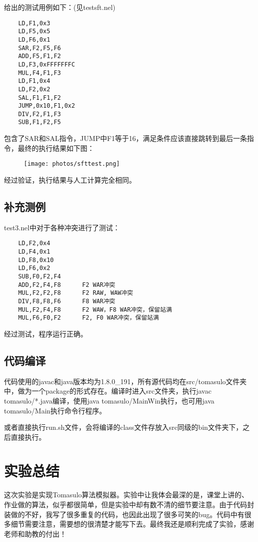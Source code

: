 \documentclass[paper=a4, fontsize=11pt, UTF8]{article} %
\begin{document}
给出的测试用例如下：(见testsft.nel)
\begin{lstlisting}
    LD,F1,0x3
    LD,F5,0x5
    LD,F6,0x1
    SAR,F2,F5,F6
    ADD,F5,F1,F2
    LD,F3,0xFFFFFFFC
    MUL,F4,F1,F3
    LD,F1,0x4
    LD,F2,0x2
    SAL,F1,F1,F2
    JUMP,0x10,F1,0x2
    DIV,F2,F1,F3
    SUB,F1,F2,F5
\end{lstlisting}
包含了SAR和SAL指令，JUMP中F1等于16，满足条件应该直接跳转到最后一条指令，最终的执行结果如下图：
\begin{figure}[H]
    \centering
    \texttt{[image: photos/sfttest.png]}
\end{figure}
经过验证，执行结果与人工计算完全相同。

\subsection{补充测例}
test3.nel中对于各种冲突进行了测试：
\begin{lstlisting}
    LD,F2,0x4
    LD,F4,0x1
    LD,F8,0x10
    LD,F6,0x2
    SUB,F0,F2,F4
    ADD,F2,F4,F8      F2 WAR冲突
    MUL,F2,F2,F8      F2 RAW, WAW冲突
    DIV,F8,F8,F6      F8 WAR冲突
    MUL,F2,F4,F8      F2 WAW，F8 WAR冲突，保留站满
    MUL,F6,F0,F2      F2, F0 WAR冲突，保留站满
\end{lstlisting}
经过测试，程序运行正确。

\subsection{代码编译}
代码使用的javac和java版本均为1.8.0\_191，所有源代码均在src/tomasulo文件夹中，做为一个package的形式存在。编译时进入src文件夹，执行javac tomasulo/*.java编译，使用java tomasulo/MainWin执行，也可用java tomasulo/Main执行命令行程序。

或者直接执行run.sh文件，会将编译的class文件存放入src同级的bin文件夹下，之后直接执行。

\section{实验总结}
这次实验是实现Tomasulo算法模拟器。实验中让我体会最深的是，课堂上讲的、作业做的算法，似乎都很简单，但是实验中却有数不清的细节要注意。由于代码封装做的不好，我写了很多重复的代码，也因此出现了很多可笑的bug。代码中有很多细节需要注意，需要想的很清楚才能写下去。最终我还是顺利完成了实验，感谢老师和助教的付出！
\end{document}
